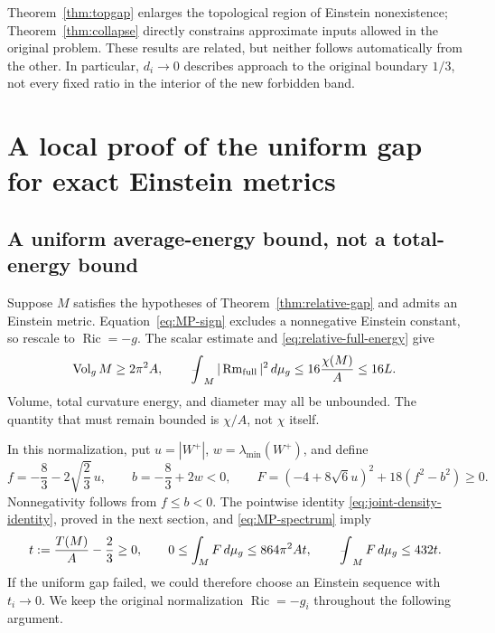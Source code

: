 \documentclass[a4paper,11pt]{article}
\numberwithin{equation}{section}
\theoremstyle{definition}
\newcommand{\Ric}{\operatorname{Ric}}
\newcommand{\Rm}{\operatorname{Rm}}
\newcommand{\Vol}{\operatorname{Vol}}
\newcommand{\dd}{\,d\mu_g}
\newcommand{\fint}{\mathop{\rlap{\,\raisebox{0.1ex}{\tiny$-$}}\int}\nolimits}
\begin{document}
Theorem~\ref{thm:topgap} enlarges the topological region of Einstein nonexistence; Theorem~\ref{thm:collapse} directly constrains approximate inputs allowed in the original problem. These results are related, but neither follows automatically from the other. In particular, $d_i\to0$ describes approach to the original boundary $1/3$, not every fixed ratio in the interior of the new forbidden band.

\section{A local proof of the uniform gap for exact Einstein metrics}
\label{sec:relative-proof}
\subsection{A uniform average-energy bound, not a total-energy bound}
Suppose $M$ satisfies the hypotheses of Theorem~\ref{thm:relative-gap} and admits an Einstein metric. Equation~\eqref{eq:MP-sign} excludes a nonnegative Einstein constant, so rescale to $\Ric=-g$. The scalar estimate and \eqref{eq:relative-full-energy} give
\begin{equation}\label{eq:budget}
 \Vol_gM\ge2\pi^2A,
 \qquad \fint_M|\Rm_{\rm full}|^2\dd
 \le16\frac{\chi(M)}A\le16L.
\end{equation}
Volume, total curvature energy, and diameter may all be unbounded. The quantity that must remain bounded is $\chi/A$, not $\chi$ itself.

In this normalization, put $u=|W^+|$, $w=\lambda_{\min}(W^+)$, and define
\begin{equation}\label{eq:exact-density}
f=-\frac83-2\sqrt{\frac23}\,u,\qquad b=-\frac83+2w<0,\qquad
F=(-4+8\sqrt6u)^2+18(f^2-b^2)\ge0.
\end{equation}
Nonnegativity follows from $f\le b<0$. The pointwise identity \eqref{eq:joint-density-identity}, proved in the next section, and \eqref{eq:MP-spectrum} imply
\begin{equation}\label{eq:exact-density-budget}
t:=\frac{T(M)}A-\frac23\ge0,\qquad
0\le\int_MF\dd\le864\pi^2At,\qquad \fint_MF\dd\le432t.
\end{equation}
If the uniform gap failed, we could therefore choose an Einstein sequence with $t_i\to0$. We keep the original normalization $\Ric=-g_i$ throughout the following argument.
\end{document}
